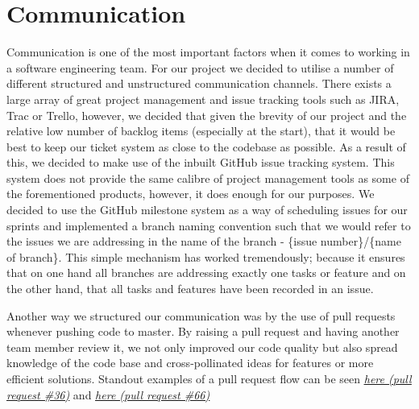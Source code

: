 \documentclass[a4paper]{report}
\begin{document}
	\section{Communication}
	Communication is one of the most important factors when it comes to working in a software engineering team. For our project we decided to utilise a number of different structured and unstructured communication channels. There exists a large array of great project management and issue tracking tools such as JIRA, Trac or Trello, however, we decided that given the brevity of our project and the relative low number of backlog items (especially at the start), that it would be best to keep our ticket system as close to the codebase as possible. As a result of this, we decided to make use of the inbuilt GitHub issue tracking system. This system does not provide the same calibre of project management tools as some of the forementioned products, however, it does enough for our purposes. We decided to use the GitHub milestone system as a way of scheduling issues for our sprints and implemented a branch naming convention such that we would refer to the issues we are addressing in the name of the branch - \{issue number\}/\{name of branch\}. This simple mechanism has worked tremendously; because it ensures that on one hand all branches are addressing exactly one tasks or feature and on the other hand, that all tasks and features have been recorded in an issue. \newline
	\par Another way we structured our communication was by the use of pull requests whenever pushing code to master. By raising a pull request and having another team member review it, we not only improved our code quality but also spread knowledge of the code base and cross-pollinated ideas for features or more efficient solutions. Standout examples of a pull request flow can be seen \href{https://github.com/davidbenicek/raytracer/pull/36}{\underline{\textit{here (pull request \#36)}}} and \href{https://github.com/davidbenicek/raytracer/pull/66}{\underline{\textit{here (pull request \#66)}}}\newline
	
\end{document}
